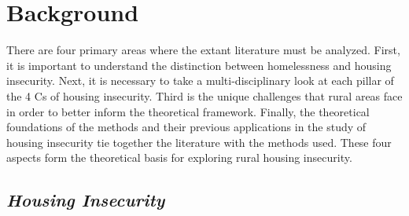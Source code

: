 \chapter{Background} %

 

There are four primary areas where the extant literature must be analyzed. First, it is important to understand the distinction between homelessness and housing insecurity. Next, it is necessary to take a multi-disciplinary look at each pillar of the 4 Cs of housing insecurity. Third is the unique challenges that rural areas face in order to better inform the theoretical framework. Finally, the theoretical foundations of the methods and their previous applications in the study of housing insecurity tie together the literature with the methods used. These four aspects form the theoretical basis for exploring rural housing insecurity. 

 

\section{\textit{Housing Insecurity}} 

 

